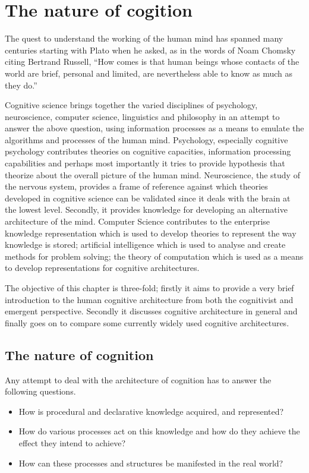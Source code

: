 \chapter{The nature of cogition}
\label{The_nature_of_cognition}

The quest to understand the working of the human mind has spanned
many centuries starting with Plato when he asked, as in the words of
Noam Chomsky citing Bertrand Russell, ``How comes is that human beings
whose contacts of the world are brief, personal and limited, are
nevertheless able to know as much as they do.'' \cite{Bogdan:1993aa}

Cognitive science brings together the varied disciplines of
psychology, neuroscience, computer science, linguistics and philosophy in an
attempt to answer the above question, using information processes as a
means to emulate the algorithms and processes of the human
mind. Psychology, especially cognitive psychology contributes theories
on cognitive capacities, information processing capabilities and
perhaps most importantly it tries to provide hypothesis that theorize
about the overall picture of the human mind. Neuroscience, the study
of the nervous system,  provides a frame of reference against which
theories developed in cognitive science can be validated since it
deals with the brain at the lowest level. Secondly, it provides  knowledge
for developing an alternative architecture of the mind. Computer
Science contributes to the enterprise knowledge representation which is
used to develop theories to represent the way knowledge is stored;
artificial intelligence which is used to analyse and create methods
for problem solving; the theory of computation which is used as a
means to develop representations for cognitive
architectures.

The objective of this chapter is three-fold; firstly it aims
to provide a very brief introduction to the human cognitive
architecture from both the cognitivist and
emergent\cite{DBLP:journals/tec/VernonMS07} perspective. Secondly
it discusses cognitive architecture in general and finally goes on
to compare some currently widely used cognitive architectures.

\section{The nature of cognition}
\label{nature_Of_Cognition}
Any attempt to deal with the architecture of cognition has to answer
the following questions.

\begin{itemize}
\item How is procedural and declarative knowledge acquired, and
represented?
\item How do various processes act on this knowledge and how do they
achieve the effect they intend to achieve?
\item How can these processes and structures be manifested in the real
world?
\end{itemize}



